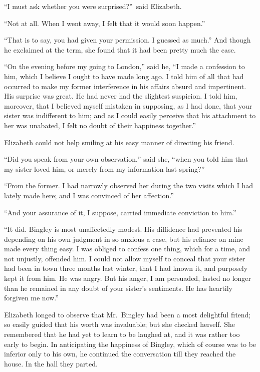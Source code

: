 \documentclass[12pt,english]{book}
\begin{document}
{}``I must ask whether you were surprised?''\ said Elizabeth.

{}``Not at all. When I went away, I felt that it would soon happen.''

{}``That is to say, you had given your permission. I guessed as much.''
And though he exclaimed at the term, she found that it had been pretty
much the case.

{}``On the evening before my going to London,'' said he, {}``I
made a confession to him, which I believe I ought to have made long
ago. I told him of all that had occurred to make my former interference
in his affairs absurd and impertinent. His surprise was great. He
had never had the slightest suspicion. I told him, moreover, that
I believed myself mistaken in supposing, as I had done, that your
sister was indifferent to him; and as I could easily perceive that
his attachment to her was unabated, I felt no doubt of their happiness
together.''

Elizabeth could not help smiling at his easy manner of directing his
friend.

{}``Did you speak from your own observation,'' said she, {}``when
you told him that my sister loved him, or merely from my information
last spring?''\


{}``From the former. I had narrowly observed her during the two visits
which I had lately made here; and I was convinced of her affection.''

{}``And your assurance of it, I suppose, carried immediate conviction
to him.''

{}``It did. Bingley is most unaffectedly modest. His diffidence had
prevented his depending on his own judgment in so anxious a case,
but his reliance on mine made every thing easy. I was obliged to confess
one thing, which for a time, and not unjustly, offended him. I could
not allow myself to conceal that your sister had been in town three
months last winter, that I had known it, and purposely kept it from
him. He was angry. But his anger, I am persuaded, lasted no longer
than he remained in any doubt of your sister's sentiments. He has
heartily forgiven me now.''

Elizabeth longed to observe that Mr.\ Bingley had been a most delightful
friend; so easily guided that his worth was invaluable; but she checked
herself. She remembered that he had yet to learn to be laughed at,
and it was rather too early to begin. In anticipating the happiness
of Bingley, which of course was to be inferior only to his own, he
continued the conversation till they reached the house. In the hall
they parted.
\end{document}
